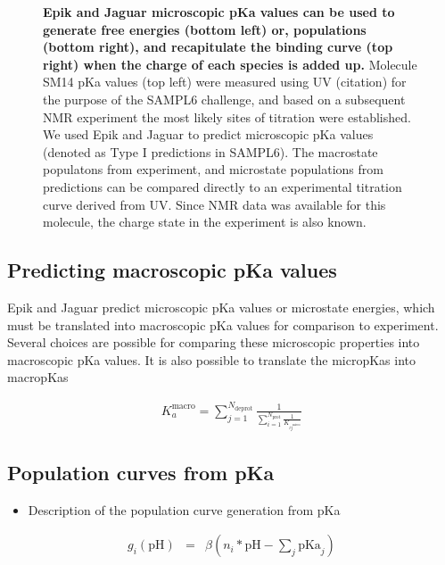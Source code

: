 \documentclass[9pt,lineno,final]{elife}
\newcommand{\pH}{\mathrm{pH}}
\newcommand{\pKa}{\mathrm{pKa}}
\begin{document}
\begin{figure}[H]
		\caption{{\bf Epik and Jaguar microscopic pKa values can be used to generate free energies (bottom left) or, populations (bottom right), and recapitulate the binding curve (top right) when the charge of each species is added up.} Molecule SM14 pKa values (top left) were measured using UV (citation) for the purpose of the SAMPL6 challenge, and based on a subsequent NMR experiment the most likely sites of titration were established. We used Epik and Jaguar to predict microscopic pKa values (denoted as Type I predictions in SAMPL6). The macrostate populatons from experiment, and microstate populations from predictions can be compared directly to an experimental titration curve derived from UV. Since NMR data was available for this molecule, the charge state in the experiment is also known.
	\label{fig:sm14-prediction}}
	
\end{figure}





\subsection{Predicting macroscopic pKa values}

Epik and Jaguar predict microscopic pKa values or microstate energies, which must be translated into macroscopic pKa values for comparison to experiment.
Several choices are possible for comparing these microscopic properties into macroscopic pKa values.
%
It is also possible to translate the micropKas into macropKas
\cite{Philipp2018macropka}

\begin{align}
 K_a^\text{macro} = \sum_{j=1}^{N_\text{deprot}} \frac{1}{\sum_{i=1}^{N_\text{prot}}\frac{1}{ K_{ij^\text{micro}}}}
 \end{align}

 

\subsection{Population curves from pKa}

\begin{itemize}
	\item Description of the population curve generation from pKa \\
\end{itemize}

\begin{eqnarray}
	g_i(\pH) &=& \beta \left( n_i*\pH - \sum_j \pKa_j \right)
\end{eqnarray}
\end{document}
